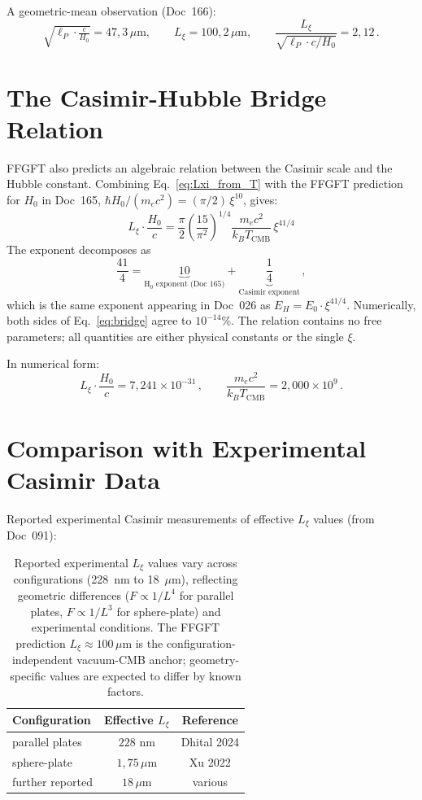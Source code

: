 \documentclass[11pt,a4paper]{article}
\begin{document}
A geometric-mean observation (Doc~166):
\begin{equation}
\sqrt{\ell_P \cdot \tfrac{c}{H_0}} = 47{,}3\,\mu\text{m}, \qquad L_\xi = 100{,}2\,\mu\text{m}, \qquad \frac{L_\xi}{\sqrt{\ell_P \cdot c/H_0}} = 2{,}12\,.
\end{equation}

\section{The Casimir-Hubble Bridge Relation}

FFGFT also predicts an algebraic relation between the Casimir scale and the Hubble constant. Combining Eq.~\eqref{eq:Lxi_from_T} with the FFGFT prediction for $H_0$ in Doc~165, $\hbar H_0 / (m_e c^2) = (\pi/2)\,\xi^{10}$, gives:
\begin{equation}
\boxed{\;L_\xi \cdot \frac{H_0}{c} = \frac{\pi}{2}\left(\frac{15}{\pi^2}\right)^{1/4} \frac{m_e c^2}{k_B T_{\mathrm{CMB}}}\,\xi^{41/4}\;}
\label{eq:bridge}
\end{equation}
The exponent decomposes as
\[
\frac{41}{4} = \underbrace{10}_{\text{H}_0\text{ exponent (Doc 165)}} + \underbrace{\frac{1}{4}}_{\text{Casimir exponent}}\,,
\]
which is the same exponent appearing in Doc~026 as $E_H = E_0 \cdot \xi^{41/4}$. Numerically, both sides of Eq.~\eqref{eq:bridge} agree to $10^{-14}\%$. The relation contains no free parameters; all quantities are either physical constants or the single $\xi$.

In numerical form:
\begin{equation}
L_\xi \cdot \frac{H_0}{c} = 7{,}241 \times 10^{-31}\,, \qquad \frac{m_e c^2}{k_B T_{\mathrm{CMB}}} = 2{,}000 \times 10^9\,.
\end{equation}

\section{Comparison with Experimental Casimir Data}

Reported experimental Casimir measurements of effective $L_\xi$ values (from Doc~091):

\begin{table}[h]
\centering
\small
\begin{tabular}{lcc}
\toprule
\textbf{Configuration} & \textbf{Effective $L_\xi$} & \textbf{Reference} \\
\midrule
parallel plates & $228$ nm & Dhital 2024 \\
sphere-plate & $1{,}75\,\mu$m & Xu 2022 \\
further reported & $18\,\mu$m & various \\
\bottomrule
\end{tabular}
\caption{Reported experimental $L_\xi$ values vary across configurations (228~nm to 18~$\mu$m), reflecting geometric differences ($F \propto 1/L^4$ for parallel plates, $F \propto 1/L^3$ for sphere-plate) and experimental conditions. The FFGFT prediction $L_\xi \approx 100\,\mu$m is the configuration-independent vacuum-CMB anchor; geometry-specific values are expected to differ by known factors.}
\end{table}
\end{document}
